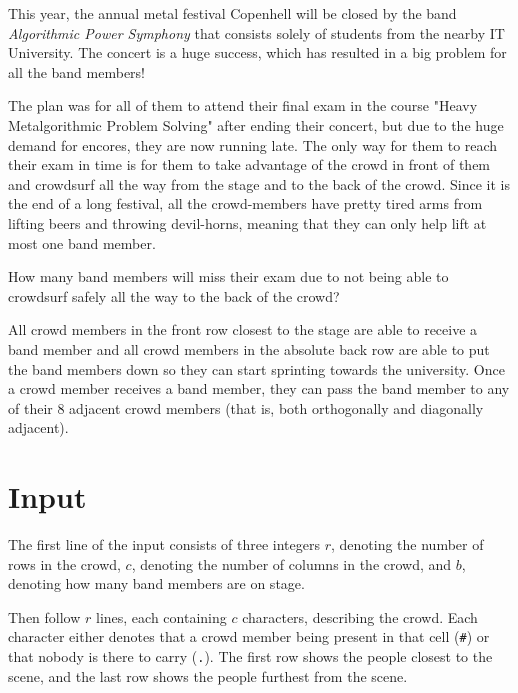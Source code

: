 

This year, the annual metal festival Copenhell will be closed by the band \textit{Algorithmic Power Symphony} that consists solely of students from the nearby IT University. The concert is a huge success, which has resulted in a big problem for all the band members!

The plan was for all of them to attend their final exam in the course "Heavy Metalgorithmic Problem Solving" after ending their concert, but due to the huge demand for encores, they are now running late. The only way for them to reach their exam in time is for them to take advantage of the crowd in front of them and crowdsurf all the way from the stage and to the back of the crowd. Since it is the end of a long festival, all the crowd-members have pretty tired arms from lifting beers and throwing devil-horns, meaning that they can only help lift at most one band member.

How many band members will miss their exam due to not being able to crowdsurf safely all the way to the back of the crowd?

All crowd members in the front row closest to the stage are able to receive a band member and all crowd members in the absolute back row are able to put the band members down so they can start sprinting towards the university.
Once a crowd member receives a band member, they can pass the band member to any of their 8 adjacent crowd members (that is, both orthogonally and diagonally adjacent).

\section*{Input}

The first line of the input consists of three integers $r$, denoting the number of rows in the crowd, $c$, denoting the number of columns in the crowd, and $b$, denoting how many band members are on stage.

Then follow $r$ lines, each containing $c$ characters, describing the crowd. Each character either denotes that a crowd member being present in that cell (\texttt{\#}) or that nobody is there to carry (\texttt{.}). The first row shows the people closest to the scene, and the last row shows the people furthest from the scene.

